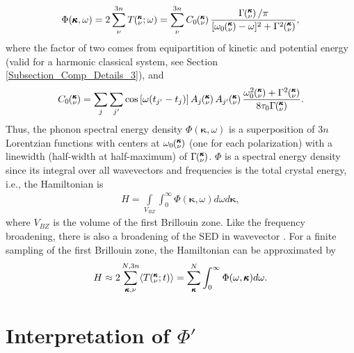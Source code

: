 \documentclass[12pt,twocolumn,iop]{/usr/share/texmf-texlive/tex/latex/iop/iopart}[/usr/share/texmf-texlive/tex/latex/iop/]
\newcommand{\kvt}{\mspace{-4.0mu}\left(\mspace{-8.0mu}\begin{smallmatrix}&\pmb{\kappa} \\&\nu\end{smallmatrix}\mspace{-2.0mu};t\right)}
\newcommand{\kvw}{\mspace{-4.0mu}\left(\mspace{-8.0mu}\begin{smallmatrix}&\pmb{\kappa} \\&\nu\end{smallmatrix}\mspace{-2.0mu};\omega\right)}
\newcommand{\kv}{\mspace{-4.0mu}\left(\mspace{-8.0mu}\begin{smallmatrix}&\pmb{\kappa} \\&\nu\end{smallmatrix}\mspace{-3.0mu}\right)}
\begin{document}
\begin{equation}\label{A:E:Lorentzian_NMD}
\begin{split}
\Phi(\pmb{\kappa},\omega) = 2\sum_{\nu}^{3n} T\kvw=\sum_{\nu}^{3n}C_0\kv\frac{\Gamma\kv/\pi}{[\omega_0\kv-\omega]^2+\Gamma^2\kv},
\end{split}
\end{equation}
where the factor of two comes from equipartition of kinetic and potential energy (valid for a harmonic classical system, see Section \ref{Subsection_Comp_Details_3}), and
\begin{equation}\label{A:E:C_0}
\begin{split}
C_0\kv = \sum_j\sum_{j'}\cos\left[\omega (t_{j'}-t_j)\right]A_j\kv A_{j'}\kv\frac{\omega_0^2\kv+\Gamma^2\kv}{8\tau_0\Gamma\kv}.
\end{split}
\end{equation}
Thus, the phonon spectral energy density $\Phi(\pmb{\kappa},\omega)$ is a superposition of $3n$ Lorentzian
functions with centers at $\omega_0\kv$ (one for each polarization) with a linewidth (half-width at half-maximum) of
$\Gamma\kv$. $\Phi$ is a spectral energy density since its integral over all wavevectors and frequencies is the total crystal energy, i.e., the Hamiltonian is
\begin{equation}\label{A:E:equipartition}
\begin{split}
H=\int\limits_{V_{BZ}} \int_{0}^{\infty}\Phi(\pmb{\kappa},\omega)d\omega d\pmb{\kappa},
\end{split}
\end{equation}
where $V_{BZ}$ is the volume of the first Brillouin zone.  Like the frequency broadening, there is also a broadening of the SED in wavevector \cite{turneythesis}. For a finite sampling of the first Brillouin zone, the Hamiltonian can be approximated by
\begin{equation}\label{A:E:equipartition}
\begin{split}
H \approx 2\sum_{\pmb{\kappa},\nu}^{N,3n}\langle T\kvt\rangle = \sum_{\pmb{\kappa}}^N \int_{0}^{\infty}\Phi(\omega,\pmb{\kappa})d\omega.
\end{split}
\end{equation}

\section{\label{Appendix_B}Interpretation of $\Phi'$}
\end{document}
